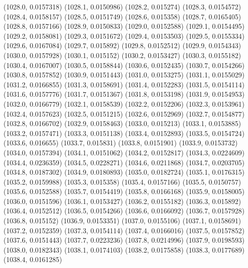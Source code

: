 {					(1028.0, 0.0157318)
					(1028.1, 0.0150986)
					(1028.2, 0.015274)
					(1028.3, 0.0154572)
					(1028.4, 0.0158157)
					(1028.5, 0.0151749)
					(1028.6, 0.015358)
					(1028.7, 0.0165405)
					(1028.8, 0.0157166)
					(1028.9, 0.0150833)
					(1029.0, 0.0152588)
					(1029.1, 0.0154495)
					(1029.2, 0.0158081)
					(1029.3, 0.0151672)
					(1029.4, 0.0153503)
					(1029.5, 0.0155334)
					(1029.6, 0.0167084)
					(1029.7, 0.015892)
					(1029.8, 0.0152512)
					(1029.9, 0.0154343)
					(1030.0, 0.0157928)
					(1030.1, 0.015152)
					(1030.2, 0.0153427)
					(1030.3, 0.0155182)
					(1030.4, 0.0167007)
					(1030.5, 0.0158844)
					(1030.6, 0.0152435)
					(1030.7, 0.0154266)
					(1030.8, 0.0157852)
					(1030.9, 0.0151443)
					(1031.0, 0.0153275)
					(1031.1, 0.0155029)
					(1031.2, 0.0166855)
					(1031.3, 0.0158691)
					(1031.4, 0.0152283)
					(1031.5, 0.0154114)
					(1031.6, 0.0157776)
					(1031.7, 0.0151367)
					(1031.8, 0.0153198)
					(1031.9, 0.0154953)
					(1032.0, 0.0166779)
					(1032.1, 0.0158539)
					(1032.2, 0.0152206)
					(1032.3, 0.0153961)
					(1032.4, 0.0157623)
					(1032.5, 0.0151215)
					(1032.6, 0.0152969)
					(1032.7, 0.0154877)
					(1032.8, 0.0166702)
					(1032.9, 0.0158463)
					(1033.0, 0.015213)
					(1033.1, 0.0153885)
					(1033.2, 0.0157471)
					(1033.3, 0.0151138)
					(1033.4, 0.0152893)
					(1033.5, 0.0154724)
					(1033.6, 0.016655)
					(1033.7, 0.015831)
					(1033.8, 0.0151901)
					(1033.9, 0.0153732)
					(1034.0, 0.0157394)
					(1034.1, 0.0151062)
					(1034.2, 0.0152817)
					(1034.3, 0.0224609)
					(1034.4, 0.0236359)
					(1034.5, 0.0228271)
					(1034.6, 0.0211868)
					(1034.7, 0.0203705)
					(1034.8, 0.0187302)
					(1034.9, 0.0180893)
					(1035.0, 0.0182724)
					(1035.1, 0.0176315)
					(1035.2, 0.0159988)
					(1035.3, 0.015358)
					(1035.4, 0.0157166)
					(1035.5, 0.0150757)
					(1035.6, 0.0152588)
					(1035.7, 0.0154419)
					(1035.8, 0.0166168)
					(1035.9, 0.0158005)
					(1036.0, 0.0151596)
					(1036.1, 0.0153427)
					(1036.2, 0.0155182)
					(1036.3, 0.015892)
					(1036.4, 0.0152512)
					(1036.5, 0.0154266)
					(1036.6, 0.0166092)
					(1036.7, 0.0157928)
					(1036.8, 0.015152)
					(1036.9, 0.0153351)
					(1037.0, 0.0155106)
					(1037.1, 0.0158691)
					(1037.2, 0.0152359)
					(1037.3, 0.0154114)
					(1037.4, 0.0166016)
					(1037.5, 0.0157852)
					(1037.6, 0.0151443)
					(1037.7, 0.0223236)
					(1037.8, 0.0214996)
					(1037.9, 0.0198593)
					(1038.0, 0.0182343)
					(1038.1, 0.0174103)
					(1038.2, 0.0175858)
					(1038.3, 0.0177689)
					(1038.4, 0.0161285)
}
